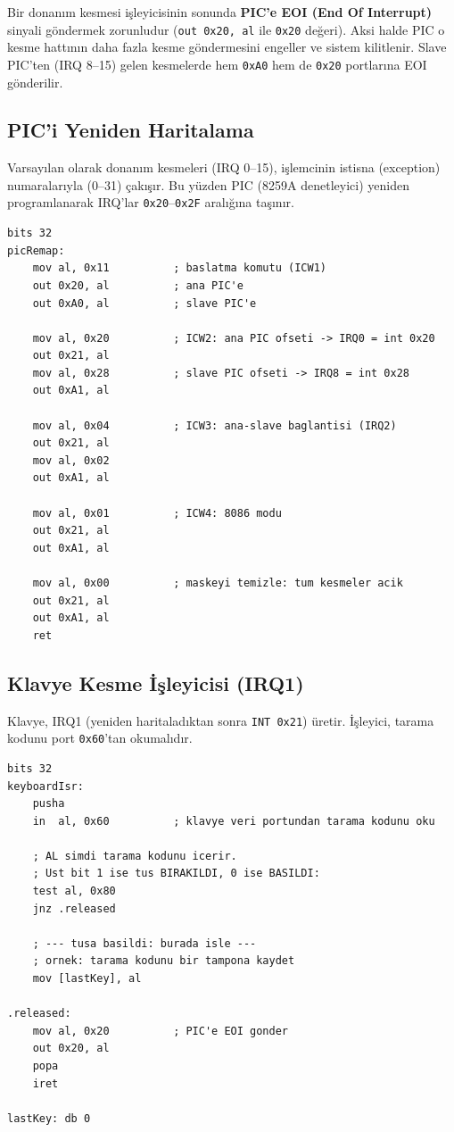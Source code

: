 \documentclass[11pt,a4paper]{article}
\newcommand{\hx}[1]{\texttt{\color{turuncu}#1}}
\newcommand{\kod}[1]{\texttt{\color{koyuGri}#1}}
\begin{document}
\begin{uyarikutu}
Bir donanım kesmesi işleyicisinin sonunda \textbf{PIC'e EOI (End Of Interrupt)}
sinyali göndermek zorunludur (\kod{out 0x20, al} ile \hx{0x20} değeri). Aksi
halde PIC o kesme hattının daha fazla kesme göndermesini engeller ve sistem
kilitlenir. Slave PIC'ten (IRQ 8--15) gelen kesmelerde hem \hx{0xA0} hem de
\hx{0x20} portlarına EOI gönderilir.
\end{uyarikutu}

\subsection{PIC'i Yeniden Haritalama}

Varsayılan olarak donanım kesmeleri (IRQ 0--15), işlemcinin istisna
(exception) numaralarıyla (0--31) çakışır. Bu yüzden PIC (8259A denetleyici)
yeniden programlanarak IRQ'lar \hx{0x20}--\hx{0x2F} aralığına taşınır.

\begin{ornekkutu}
\begin{lstlisting}
bits 32
picRemap:
    mov al, 0x11          ; baslatma komutu (ICW1)
    out 0x20, al          ; ana PIC'e
    out 0xA0, al          ; slave PIC'e

    mov al, 0x20          ; ICW2: ana PIC ofseti -> IRQ0 = int 0x20
    out 0x21, al
    mov al, 0x28          ; slave PIC ofseti -> IRQ8 = int 0x28
    out 0xA1, al

    mov al, 0x04          ; ICW3: ana-slave baglantisi (IRQ2)
    out 0x21, al
    mov al, 0x02
    out 0xA1, al

    mov al, 0x01          ; ICW4: 8086 modu
    out 0x21, al
    out 0xA1, al

    mov al, 0x00          ; maskeyi temizle: tum kesmeler acik
    out 0x21, al
    out 0xA1, al
    ret
\end{lstlisting}
\end{ornekkutu}

\subsection{Klavye Kesme İşleyicisi (IRQ1)}

Klavye, IRQ1 (yeniden haritaladıktan sonra \hx{INT 0x21}) üretir. İşleyici,
tarama kodunu port \hx{0x60}'tan okumalıdır.

\begin{ornekkutu}
\begin{lstlisting}
bits 32
keyboardIsr:
    pusha
    in  al, 0x60          ; klavye veri portundan tarama kodunu oku

    ; AL simdi tarama kodunu icerir.
    ; Ust bit 1 ise tus BIRAKILDI, 0 ise BASILDI:
    test al, 0x80
    jnz .released

    ; --- tusa basildi: burada isle ---
    ; ornek: tarama kodunu bir tampona kaydet
    mov [lastKey], al

.released:
    mov al, 0x20          ; PIC'e EOI gonder
    out 0x20, al
    popa
    iret

lastKey: db 0
\end{lstlisting}
\end{ornekkutu}
\end{document}
